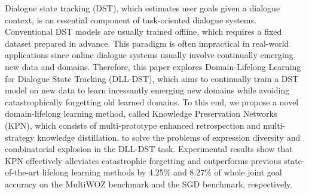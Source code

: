 Dialogue state tracking (DST), which estimates user goals given a dialogue context, is an essential component of task-oriented dialogue systems. Conventional DST models are usually trained offline, which requires a fixed dataset prepared in advance. This paradigm is often impractical in real-world applications since online dialogue systems usually involve continually emerging new data and domains. Therefore, this paper explores Domain-Lifelong Learning for Dialogue State Tracking (DLL-DST), which aims to continually train a DST model on new data to learn incessantly emerging new domains while avoiding catastrophically forgetting old learned domains. To this end, we propose a novel domain-lifelong learning method, called Knowledge Preservation Networks (KPN), which consists of multi-prototype enhanced retrospection and multi-strategy knowledge distillation, to solve the problems of expression diversity and combinatorial explosion in the DLL-DST task. Experimental results show that KPN effectively alleviates catastrophic forgetting and outperforms previous state-of-the-art lifelong learning methods by 4.25\% and 8.27\% of whole joint goal accuracy on the MultiWOZ benchmark and the SGD benchmark, respectively.
